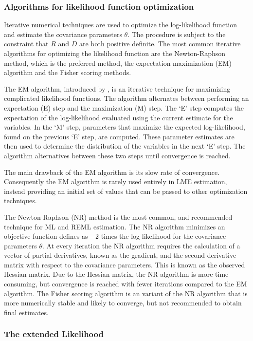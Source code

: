 \documentclass[12pt, a4paper]{report}
\theoremstyle{plain}
\theoremstyle{definition}
\theoremstyle{remark}
\begin{document}
			
			\subsubsection{Algorithms for likelihood function optimization}Iterative numerical techniques are used to optimize the log-likelihood function and estimate the covariance parameters $\theta$. The procedure is subject to the constraint that $R$ and $D$ are both positive definite. The most common iterative algorithms for optimizing the likelihood function are the Newton-Raphson method, which is the preferred method, the expectation maximization (EM) algorithm and the Fisher scoring methods.
			
			The EM algorithm, introduced by \citet{EM}, is an iterative technique for maximizing complicated likelihood functions. The algorithm alternates between performing an expectation (E) step
			and the maximization (M) step. The `E' step computes the expectation of the log-likelihood evaluated using the current
			estimate for the variables. In the `M' step, parameters that maximize the expected log-likelihood, found on the previous `E' step, are computed. These parameter estimates are then used to determine the distribution of the variables in the next `E' step. The algorithm alternatives between these two steps until convergence is reached.
			
			The main drawback of the EM algorithm is its slow rate of
			convergence. Consequently the EM algorithm is rarely used entirely in LME estimation,
			instead providing an initial set of values that can be passed to
			other optimization techniques.
			
			The Newton Raphson (NR) method is the most common, and recommended technique for ML and
			REML estimation. The NR algorithm minimizes an objective function defines as $-2$ times the log likelihood for the covariance parameters $\theta$. At every iteration the NR algorithm requires the
			calculation of a vector of partial derivatives, known as the gradient, and the second derivative matrix with respect to the covariance parameters. This is known as the observed Hessian matrix. Due to the Hessian matrix, the NR algorithm is more time-consuming, but convergence is reached with fewer iterations compared to the EM algorithm. The Fisher scoring algorithm is an variant of the NR algorithm that is more numerically stable and likely to converge, but not recommended to obtain final estimates.
			
			\subsubsection{The extended Likelihood}
			
\end{document}
